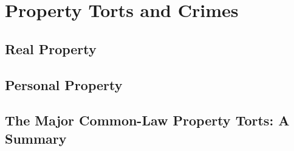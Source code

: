 \chapter{Property Torts and Crimes}

\section{Real Property}



\section{Personal Property}



\section{The Major Common-Law Property Torts: A Summary}


